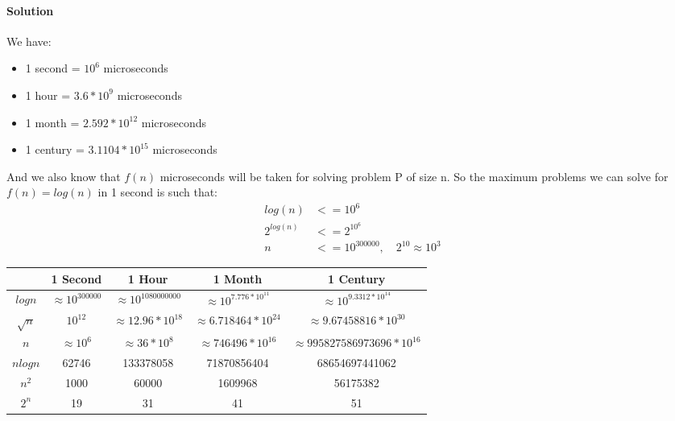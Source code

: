 \documentclass{article}
\begin{document}
\paragraph{Solution}
  We have:\par
  \begin{itemize}
    \item 1 second = $10^6$ microseconds
    \item 1 hour = $3.6*10^9$ microseconds
    \item 1 month = $2.592*10^12$ microseconds
    \item 1 century = $3.1104*10^15$ microseconds
  \end{itemize}

  And we also know that $f(n)$ microseconds will be taken for solving problem P of size n.
  So the maximum problems we can solve for $f(n) = log(n)$ in 1 second is such that:
  \begin{align*}
    log(n) &<= 10^6 \\
    2^{log(n)} &<= 2^{10^6}\\
    n &<= 10^{300000}, \quad 2^{10}\approx 10^3
  \end{align*}
  \begin{table}[h!]
    \begin{center}
        \begin{adjustbox}{width={\textwidth},totalheight={\textheight},keepaspectratio}
        \begin{tabular}{|c|c|c|c|c|}
          \hline
          & \textbf{1 Second} & \textbf{1 Hour}& \textbf{1 Month} & \textbf{1 Century} \\
          \hline
          $logn$ & $\approx 10^{300000}$& $\approx 10^{1080000000}$ & $\approx 10^{7.776*10^{11}}$ & $\approx 10^{9.3312*10^{14}}$        \\
          
          $\sqrt{n}$ & $ 10^{12}$&$\approx 12.96 * 10^{18}$ & $\approx 6.718464 * 10^{24}$ & $\approx 9.67458816 * 10^{30}$           \\
          
          $n$ & $\approx 10^{6}$&$\approx 36*10^{8}$ & $\approx 746496*10^{16}$ & $\approx 995827586973696*10^{16}$       \\
          
          $nlogn$ & 62746& 133378058& 71870856404 & 68654697441062       \\
          
          $n^2$ & 1000& 60000& 1609968 & 56175382         \\
          
          $2^n$ & 19& 31& 41 &51          \\
          \hline
        \end{tabular}
      \end{adjustbox}
    \end{center}
  \end{table}
\end{document}
